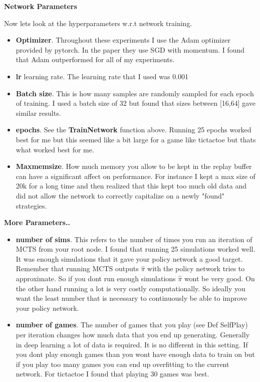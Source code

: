 \textbf{Network Parameters}

Now lets look at the hyperparameters w.r.t network training. 

\begin{itemize}
    \item \textbf{Optimizer}. Throughout these experiments I use the Adam optimizer provided by pytorch. In the paper they use SGD with momentum. I found that Adam outperformed for all of my experiments. 
    \item \textbf{lr} learning rate. The learning rate that I used was 0.001
    \item \textbf{Batch size}. This is how many samples are randomly sampled for each epoch of training. I used a batch size of 32 but found that sizes between [16,64] gave similar results. 
    \item \textbf{epochs}. See the \textbf{TrainNetwork} function above. Running 25 epochs worked best for me but this seemed like a bit large for a game like tictactoe but thats what worked best for me. 
    \item \textbf{Maxmemsize}. How much memory you allow to be kept in the replay buffer can have a significant affect on performance. For instance I kept a max size of 20k for a long time and then realized that this kept too much old data and did not allow the network to correctly capitalize on a newly "found" strategies. 
    
\end{itemize}

\textbf{More Parameters..}

\begin{itemize}
    \item \textbf{number of sims}. This refers to the number of times you run an iteration of MCTS from your root node. I found that running 25 simulations worked well. It was enough simulations that it gave your policy network a good target. Remember that running MCTS outputs $\hat{\pi}$ with the policy network tries to approximate. So if you dont run enough simulations $\hat{\pi}$ wont be very good. On the other hand running a lot is very costly computationally. So ideally you want the least number that is necessary to continuously be able to improve your policy network. 
    \item \textbf{number of games}. The number of games that you play (see Def SelfPlay) per iteration changes how much data that you end up generating. Generally in deep learning a lot of data is required. It is no different in this setting. If you dont play enough games than you wont have enough data to train on but if you play too many games you can end up overfitting to the current network. For tictactoe I found that playing 30 games was best. 
\end{itemize}

